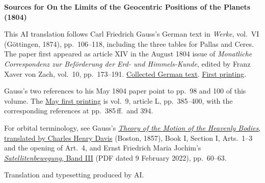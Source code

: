 \clearpage\thispagestyle{empty}
\begin{center}\textbf{Sources for On the Limits of the Geocentric Positions of the Planets (1804)}\end{center}
\noindent This AI translation follows Carl Friedrich Gauss’s German text in \textit{Werke}, vol.~VI (Göttingen, 1874), pp.~106--118, including the three tables for Pallas and Ceres. The paper first appeared as article XIV in the August 1804 issue of \textit{Monatliche Correspondenz zur Beförderung der Erd- und Himmels-Kunde}, edited by Franz Xaver von Zach, vol.~10, pp.~173--191. \href{https://gdz.sub.uni-goettingen.de/id/PPN236007467}{Collected German text}. \href{https://www.digitale-sammlungen.de/en/view/bsb10538602?page=181}{First printing}.
\par\smallskip\noindent Gauss’s two references to his May 1804 paper point to pp.~98 and 100 of this volume. The \href{https://www.digitale-sammlungen.de/en/view/bsb10538601?page=421}{May first printing} is vol.~9, article L, pp.~385--400, with the corresponding references at pp.~385\,ff.\ and 394.
\par\smallskip\noindent For orbital terminology, see Gauss’s \href{https://www2.karlin.mff.cuni.cz/~tuma/Aplikace21/theoryofmotionof00gausuoft.pdf#page=28}{\textit{Theory of the Motion of the Heavenly Bodies}, translated by Charles Henry Davis} (Boston, 1857), Book I, Section I, Arts.~1--3 and the opening of Art.~4, and Ernst Friedrich Maria Jochim’s \href{https://elib.dlr.de/94028/1/SAB-III-gesamt-2022-02-09.pdf#page=74}{\textit{Satellitenbewegung}, Band III} (PDF dated 9 February 2022), pp.~60--63.
\par\smallskip\noindent Translation and typesetting produced by AI.
\clearpage

